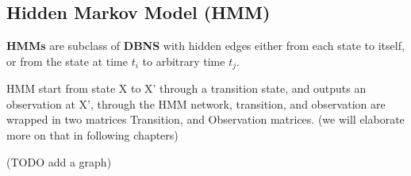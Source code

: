 \documentclass[4apaper,12pt]{book}
\begin{document}
\begin{description}
    \subsection{Hidden Markov Model (HMM)}
    \begin{description}
    \item \textbf{HMMs} are subclass of \textbf{DBNS} with hidden edges either from each state to itself, or from the state at time $t_i$ to arbitrary time $t_j$.
    \item HMM start from state X to X' through a transition state, and outputs an observation at X', through the HMM network, transition, and observation are wrapped in two matrices Transition, and Observation matrices. (we will elaborate more on that in following chapters)
    \item (TODO add a graph)
    \end{description}

  \end{description}
\end{document}
